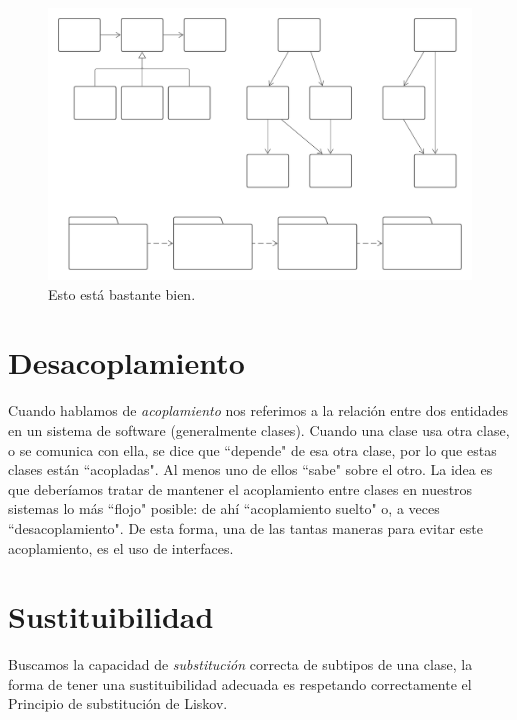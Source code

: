 \documentclass[a4paper,11pt]{article}
\begin{document}
\begin{figure}[!h]
    \centering
    \includegraphics[scale=.5]{assets/gc1.png}
    \caption{Esto está bastante bien.}
\end{figure}

\section{Desacoplamiento}
Cuando hablamos de \emph{acoplamiento} nos referimos a la relación entre dos 
entidades en un sistema de software (generalmente clases).  Cuando una clase 
usa otra clase, o se comunica con ella, se dice que ``depende" de esa otra 
clase, por lo que estas clases están ``acopladas". Al menos uno de ellos 
``sabe" sobre el otro. La idea es que deberíamos tratar de mantener el 
acoplamiento entre clases en nuestros sistemas lo más ``flojo" posible: de ahí 
``acoplamiento suelto" o, a veces ``desacoplamiento". De esta forma, una de las 
tantas maneras para evitar este acoplamiento, es el uso de interfaces.

\section{Sustituibilidad}
Buscamos la capacidad de \emph{substitución} correcta de subtipos de una clase, 
la forma de tener una sustituibilidad adecuada es respetando correctamente el 
Principio de substitución de Liskov.

{}

\end{document}
